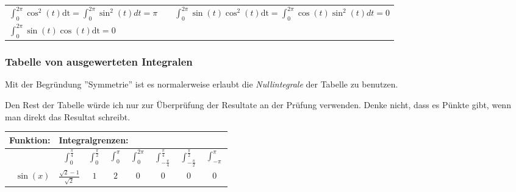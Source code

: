 \begin{multicols*}{2}
\begin{center}
\begin{tabular}{l c l}
            $\displaystyle \int_0^{2\pi}\cos^2(t)\text{dt} =\displaystyle \int_0^{2\pi}\sin^2(t)dt = \pi$            & \hspace*{+10pt} & $\displaystyle \int_0^{2\pi}\sin(t)\cos^2(t)\text{dt} =\displaystyle \int_0^{2\pi}\cos(t)\sin^2(t)dt=0$ \\
            $\displaystyle \int_0^{2\pi}\sin(t)\cos(t)\text{dt} =0$                                                  & \hspace*{+10pt} &                                                                                                         \\
            \toprule
        \end{tabular}
    \end{center}

    \subsubsection{Tabelle von ausgewerteten Integralen}

    Mit der Begründung ''Symmetrie'' ist es normalerweise erlaubt die \emph{Nullintegrale} der Tabelle zu benutzen. \medskip

    Den Rest der Tabelle würde ich nur zur Überprüfung der Resultate an der Prüfung verwenden. Denke nicht, dass es Pünkte gibt, wenn man direkt das Resultat schreibt.

    \begin{center}
        \renewcommand{\arraystretch}{1.5}
        \begin{tabular}{ r c c c c c c c }\toprule
            \textbf{Funktion:}     & \multicolumn{5}{l}{\textbf{Integralgrenzen:}}                                                                                                                                                                                                                                                       \\
            \midrule
                                   & $\displaystyle\int_0^{\frac{\pi}{4}}$         & $\displaystyle\int_0^{\frac{\pi}{2}}$ & $\displaystyle\int_0^{\pi}$ & $\displaystyle\int_0^{2\pi}$ & $\displaystyle\int_{-\frac{\pi}{4}}^{\frac{\pi}{4}}$ & $\displaystyle\int_{-\frac{\pi}{2}}^{\frac{\pi}{2}}$ & $\displaystyle\int_{-\pi}^{\pi}$ \\
            \midrule
            $\sin(x)$              & $\frac{\sqrt{2}-1}{\sqrt{2}}$                 & $1$                                   & $2$                         & $0$                          & $0$                                                  & $0$                                                  & $0$                              \\


\end{tabular}
\end{center}
\end{multicols*}
